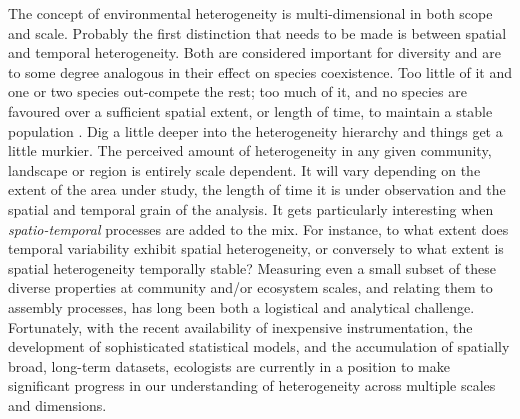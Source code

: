 The concept of environmental heterogeneity is multi-dimensional in both scope and scale. Probably the first distinction that needs to be made is between spatial and temporal heterogeneity. Both are considered important for diversity and are to some degree analogous in their effect on species coexistence. Too little of it and one or two species out-compete the rest; too much of it, and no species are favoured over a sufficient spatial extent, or length of time, to maintain a stable population \citep{Levine2004, Adler2008, Shurin2010}. Dig a little deeper into the heterogeneity hierarchy and things get a little murkier. The perceived amount of heterogeneity in any given community, landscape or region is entirely scale dependent. It will vary depending on the extent of the area under study, the length of time it is under observation and the spatial and temporal grain of the analysis. It gets particularly interesting when \textit{spatio-temporal} processes are added to the mix. For instance, to what extent does temporal variability exhibit spatial heterogeneity, or conversely to what extent is spatial heterogeneity temporally stable? Measuring even a small subset of these diverse properties at community and/or ecosystem scales, and relating them to assembly processes, has long been both a logistical and analytical challenge. Fortunately, with the recent availability of inexpensive instrumentation, the development of sophisticated statistical models, and the accumulation of spatially broad, long-term datasets, ecologists are currently in a position to make significant progress in our understanding of heterogeneity across multiple scales and dimensions.

